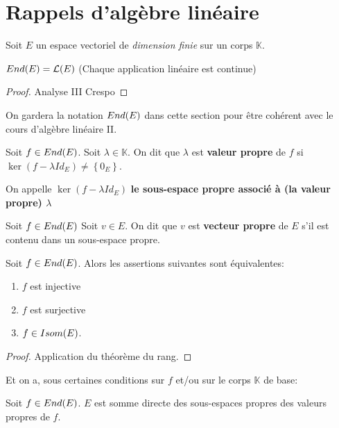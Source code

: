 \section{Rappels d'algèbre linéaire}

Soit $E$ un espace vectoriel de \textit{dimension finie} sur un corps
$\mathbb{K}$.

\begin{proposition}
	$End(E) = \mathcal{L}(E)$
	(Chaque application linéaire est continue)
\end{proposition}

\begin{proof}
	Analyse III Crespo
\end{proof}

On gardera la notation $End(E)$ dans cette section pour être
cohérent avec le cours d'algèbre linéaire II.

\begin{definition}
	\label{def:alg_lin_valeur_propre}
	Soit $f \in End(E)$.
	Soit $\lambda \in \mathbb{K}$.
	On dit que $\lambda$ est \textbf{valeur propre} de $f$ si $\ker(f - \lambda
		Id_{E}) \neq \left\{ 0_{E} \right\}$.

	On appelle $\ker(f - \lambda Id_{E})$ \textbf{le sous-espace propre associé
	à (la valeur propre) $\lambda$}
\end{definition}

\begin{definition}
	\label{def:alg_lin_vecteur_propre}
	Soit $f \in End(E)$
	Soit $v \in E$.
	On dit que $v$ est \textbf{vecteur propre} de $E$ s'il est contenu dans un
	sous-espace propre.
\end{definition}

\begin{proposition}
	Soit $f \in End(E)$.
	Alors les assertions suivantes sont équivalentes:

	\begin{enumerate}
		\item $f$ est injective
		\item $f$ est surjective
		\item $f \in Isom(E)$.
	\end{enumerate}
\end{proposition}

\begin{proof}
	Application du théorème du rang.
\end{proof}

Et on a, sous certaines conditions sur $f$ et/ou sur le corps $\mathbb{K}$ de
base:

\begin{proposition}
	Soit $f \in End(E)$. $E$ est somme
	directe des sous-espaces propres des valeurs propres de $f$.
\end{proposition}
